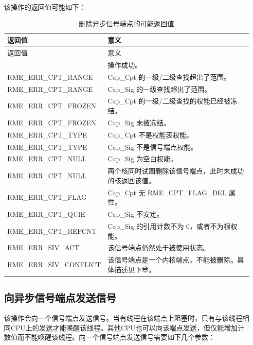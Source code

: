 该操作的返回值可能如下：

\begin{xltabular}{\textwidth}{@{}>{\hsize\raggedright\arraybackslash}X>{\hsize\raggedright\arraybackslash}X@{}}
\caption{删除异步信号端点的可能返回值}\label{tab:5-19-delete-signal-endpoint-return-values}\\
\toprule
返回值 & 意义\tabularnewline
\endfirsthead
\toprule
返回值 & 意义\tabularnewline
\midrule
\endhead
\bottomrule
{} & 操作成功。\tabularnewline
    RME\_ERR\_CPT\_RANGE & Cap\_Cpt 的一级/二级查找超出了范围。\tabularnewline
    RME\_ERR\_CPT\_RANGE & Cap\_Sig 的一级查找超出了范围。\tabularnewline
    RME\_ERR\_CPT\_FROZEN & Cap\_Cpt 的一级/二级查找的权能已经被冻结。\tabularnewline
    RME\_ERR\_CPT\_FROZEN & Cap\_Sig 未被冻结。\tabularnewline
    RME\_ERR\_CPT\_TYPE & Cap\_Cpt 不是权能表权能。\tabularnewline
    RME\_ERR\_CPT\_TYPE & Cap\_Sig 不是信号端点权能。\tabularnewline
    RME\_ERR\_CPT\_NULL & Cap\_Sig 为空白权能。\tabularnewline
    RME\_ERR\_CPT\_NULL & 两个核同时试图删除该信号端点，此时未成功的核返回该值。\tabularnewline
    RME\_ERR\_CPT\_FLAG & Cap\_Cpt 无 RME\_CPT\_FLAG\_DEL 属性。\tabularnewline
    RME\_ERR\_CPT\_QUIE & Cap\_Sig 不安定。\tabularnewline
    RME\_ERR\_CPT\_REFCNT & Cap\_Sig 的引用计数不为 0，或者不为根权能。\tabularnewline
    RME\_ERR\_SIV\_ACT & 该信号端点仍然处于被使用状态。\tabularnewline
    RME\_ERR\_SIV\_CONFLICT & 该信号端点是一个内核端点，不能被删除。具体描述见下章。\tabularnewline
\end{xltabular}

\subsection{向异步信号端点发送信号}\label{subsec:5-send-signal-to-signal-endpoint}
\nopagebreak[4]

该操作会向一个信号端点发送信号。当有线程在该端点上阻塞时，只有与该线程相同CPU上的发送才能唤醒该线程。其他CPU也可以向该端点发送，但仅能增加计数值而不能唤醒该线程。向一个信号端点发送信号需要如下几个参数：

